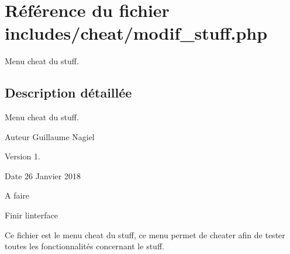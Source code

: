 \hypertarget{modif__stuff_8php}{}\section{Référence du fichier includes/cheat/modif\+\_\+stuff.php}
\label{modif__stuff_8php}


Menu cheat du stuff.  




\subsection{Description détaillée}
Menu cheat du stuff. 

\begin{DoxyAuthor}{Auteur}
Guillaume Nagiel 
\end{DoxyAuthor}
\begin{DoxyVersion}{Version}
1. 
\end{DoxyVersion}
\begin{DoxyDate}{Date}
26 Janvier 2018 
\end{DoxyDate}
\begin{DoxyRefDesc}{A faire}
\item[\mbox{\hyperlink{todo__todo000001}{A faire}}]Finir l\textquotesingle{}interface \end{DoxyRefDesc}


Ce fichier est le menu cheat du stuff, ce menu permet de cheater afin de tester toutes les fonctionnalités concernant le stuff. 